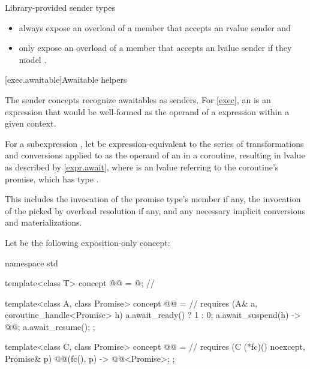 \pnum
Library-provided sender types
\begin{itemize}
\item
always expose an overload of a member 
that accepts an rvalue sender and
\item
only expose an overload of a member 
that accepts an lvalue sender if they model .
\end{itemize}

[exec.awaitable]{Awaitable helpers}

\pnum
The sender concepts recognize awaitables as senders.
For \ref{exec}, an  is an expression
that would be well-formed as the operand of a  expression
within a given context.

\pnum
For a subexpression ,
let  be expression-equivalent to
the series of transformations and conversions applied to 
as the operand of an  in a coroutine,
resulting in lvalue  as described by \ref{expr.await},
where  is an lvalue referring to the coroutine's promise,
which has type .
\begin{note}
This includes the invocation of
the promise type's  member if any,
the invocation of the 
picked by overload resolution if any, and
any necessary implicit conversions and materializations.
\end{note}

\pnum
Let  be the following exposition-only concept:
\begin{codeblock}
namespace std {
  template<class T>
  concept @@ = @\seebelow@;                     // \expos

  template<class A, class Promise>
  concept @@ =                                          // \expos
    requires (A& a, coroutine_handle<Promise> h) {
      a.await_ready() ? 1 : 0;
      { a.await_suspend(h) } -> @@;
      a.await_resume();
    };

  template<class C, class Promise>
  concept @@ =                                        // \expos
    requires (C (*fc)() noexcept, Promise& p) {
      { @@(fc(), p) } -> @@<Promise>;
    };
}
\end{codeblock}

